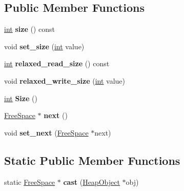 \subsection*{Public Member Functions}
\begin{DoxyCompactItemize}
\item 
\mbox{\label{classv8_1_1internal_1_1FreeSpace_a5a8579c666adffd4c716ac1e00525cda}} 
\mbox{\hyperlink{classint}{int}} {\bfseries size} () const
\item 
\mbox{\label{classv8_1_1internal_1_1FreeSpace_ae6e7329405deeb3d629da55f78a56a86}} 
void {\bfseries set\+\_\+size} (\mbox{\hyperlink{classint}{int}} value)
\item 
\mbox{\label{classv8_1_1internal_1_1FreeSpace_a274094b74f326c906efe5f25e0224583}} 
\mbox{\hyperlink{classint}{int}} {\bfseries relaxed\+\_\+read\+\_\+size} () const
\item 
\mbox{\label{classv8_1_1internal_1_1FreeSpace_ac177f8898c8f9b567526250cc1e0e907}} 
void {\bfseries relaxed\+\_\+write\+\_\+size} (\mbox{\hyperlink{classint}{int}} value)
\item 
\mbox{\label{classv8_1_1internal_1_1FreeSpace_add46e42a33fdf2fca5a450f278f54f48}} 
\mbox{\hyperlink{classint}{int}} {\bfseries Size} ()
\item 
\mbox{\label{classv8_1_1internal_1_1FreeSpace_ad6b65705011e8b68d15f1982412d748a}} 
\mbox{\hyperlink{classv8_1_1internal_1_1FreeSpace}{Free\+Space}} $\ast$ {\bfseries next} ()
\item 
\mbox{\label{classv8_1_1internal_1_1FreeSpace_a6310268fe3056a1ba45db0daeb66229b}} 
void {\bfseries set\+\_\+next} (\mbox{\hyperlink{classv8_1_1internal_1_1FreeSpace}{Free\+Space}} $\ast$next)
\end{DoxyCompactItemize}
\subsection*{Static Public Member Functions}
\begin{DoxyCompactItemize}
\item 
\mbox{\label{classv8_1_1internal_1_1FreeSpace_aa3f4712f46d50f0bd97622c0db7c2701}} 
static \mbox{\hyperlink{classv8_1_1internal_1_1FreeSpace}{Free\+Space}} $\ast$ {\bfseries cast} (\mbox{\hyperlink{classv8_1_1internal_1_1HeapObject}{Heap\+Object}} $\ast$obj)
\end{DoxyCompactItemize}
